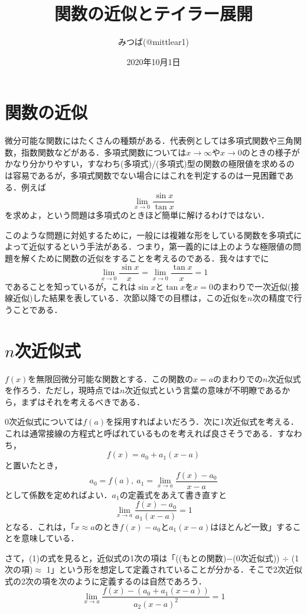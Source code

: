 \documentclass[uplatex]{jsarticle}
\theoremstyle{definition}
\begin{document}
\title{関数の近似とテイラー展開}
\author{みつば(@mittlear1)}
\date{2020年10月1日}
\maketitle

\section{関数の近似}
微分可能な関数にはたくさんの種類がある．代表例としては多項式関数や三角関数，指数関数などがある．多項式関数については$x \to \infty$や$x \to 0$のときの様子がかなり分かりやすい，すなわち(多項式)/(多項式)型の関数の極限値を求めるのは容易であるが，多項式関数でない場合にはこれを判定するのは一見困難である．例えば
\[\lim_{x\to 0} \frac{\sin x}{\tan x} \]
を求めよ，という問題は多項式のときほど簡単に解けるわけではない．

このような問題に対処するために，一般には複雑な形をしている関数を多項式によって近似するという手法がある．つまり，第一義的には上のような極限値の問題を解くために関数の近似をすることを考えるのである．我々はすでに
\[ \lim_{x\to 0} \frac{\sin x}{x}=\lim_{x\to 0} \frac{\tan x}{x}=1 \]
であることを知っているが，これは$\sin x$と$\tan x$を$x=0$のまわりで一次近似(接線近似)した結果を表している．次節以降での目標は，この近似を$n$次の精度で行うことである．

\section{$n$次近似式}
$f(x)$を無限回微分可能な関数とする．この関数の$x=a$のまわりでの$n$次近似式を作ろう．ただし，現時点では$n$次近似式という言葉の意味が不明瞭であるから，まずはそれを考えるべきである．

0次近似式については$f(a)$を採用すればよいだろう．次に1次近似式を考える．これは通常接線の方程式と呼ばれているものを考えれば良さそうである．すなわち，
\[ f(x)=a_0+a_1(x-a) \]
と置いたとき，
\[ a_0=f(a),\ a_1=\lim_{x\to a} \frac{f(x)-a_0}{x-a} \]
として係数を定めればよい．$a_1$の定義式をあえて書き直すと
\begin{equation} \lim_{x\to a} \frac{f(x)-a_0}{a_1(x-a)}=1 \end{equation}
となる．これは，「$x\approx a$のとき$f(x)-a_0$と$a_1(x-a)$はほとんど一致」することを意味している．

さて，(1)の式を見ると，近似式の1次の項は「((もとの関数)$-$(0次近似式)) $\div$ (1次の項)$\approx$ 1」という形を想定して定義されていることが分かる．そこで2次近似式の2次の項を次のように定義するのは自然であろう．
\begin{equation} \lim_{x\to a} \frac{f(x)-(a_0+a_1(x-a))}{a_2(x-a)^2}=1 \end{equation}
\end{document}
